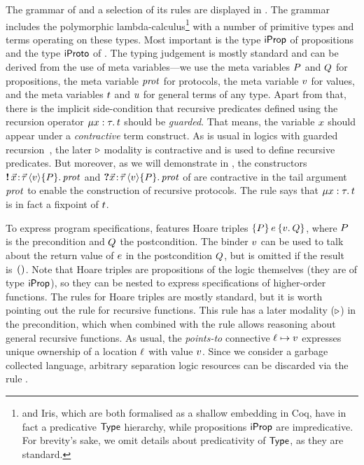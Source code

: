 The grammar of \lname and a selection of its rules are displayed in
.
The \lname grammar includes the polymorphic lambda-calculus\footnote{\lname
and Iris, which are both formalised as a shallow embedding in Coq, have in fact
a predicative $\mathsf{Type}$ hierarchy, while propositions $\mathsf{iProp}$ are impredicative.
For brevity's sake, we omit details about predicativity of $\mathsf{Type}$, as they are
standard.}
with a number of primitive types and terms operating on these types.
Most important is the type $\mathsf{iProp}$ of propositions and the type $\mathsf{iProto}$ of
\pname.
The typing judgement is mostly standard and can be derived from the use of
meta variables---we use the meta variables $P$ and $Q$ for propositions,
the meta variable $\mathit{prot}$ for protocols,
the meta variable $v$ for values,
and the meta variables $t$ and $u$ for general terms of any type.
Apart from that, there is the implicit side-condition that recursive
predicates defined using the recursion operator $\MU \var:\type. \term$ should be
\emph{guarded}.
That means, the variable $x$ should appear under a \emph{contractive} term
construct.
As is usual in logics with guarded recursion~\cite{nakano-LICS2000}, the later
$\mathop{{\triangleright}}$ modality is contractive and is used to define recursive predicates.
But moreover, as we will demonstrate in , the constructors
$\sendprot {\xdots} \val \iprop \prot$ and $\recvprot {\xdots} \val \iprop \prot$
of \pname are contractive in the tail argument $\mathit{prot}$ to enable the
construction of recursive protocols.
The rule  says that $\MU \var:\type. \term$ is in fact
a fixpoint of $t$.

To express program specifications, \lname features Hoare triples
$\hoare \iprop \expr {\Ret \val.\ipropB}$, where $P$ is the precondition and
$Q$ the postcondition.
The binder $v$ can be used to talk about the return value of $e$ in
the postcondition $Q$, but is omitted if the result is~$()$.
Note that Hoare triples are propositions of the logic themselves (\ie they
are of type $\mathsf{iProp}$), so they can be nested to express specifications of
higher-order functions.
The rules for Hoare triples are mostly standard, but it is worth pointing out
the rule  for recursive functions.
This rule has a later modality ($\mathop{{\triangleright}}$) in the precondition, which when combined
with the  rule allows reasoning about general recursive functions.
As usual, the \emph{points-to} connective
$\ell \mapsto v$ expresses unique ownership of a location $\ell$ with
value $v$.
Since we consider a garbage collected language,
arbitrary separation logic resources can be discarded via the rule .

